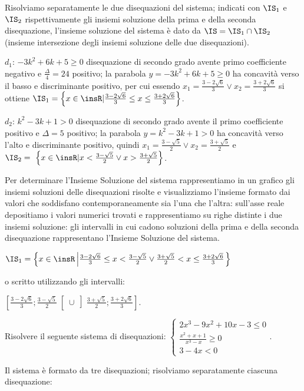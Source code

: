 Risolviamo separatamente le due disequazioni del sistema; indicati con $\IS_1$ 
e 
$\IS_2$ rispettivamente gli insiemi soluzione della prima e della seconda 
disequazione, l'insieme soluzione del sistema è dato da $\IS=\IS_1\cap \IS_2$ 
(insieme intersezione degli insiemi soluzione delle due disequazioni).
\begin{itemize*}
\item $d_1$: $-3k^2+6k+5\ge 0$ disequazione di secondo grado avente primo 
coefficiente negativo e $\frac{\Delta } 4=24$ positivo; la parabola 
$y=-3k^2+6k+5\ge 0$ ha concavità verso il basso e discriminante positivo, per 
cui essendo $x_1=\frac{3-2\sqrt 6} 3\vee x_2=\frac{3+2\sqrt 6} 3$ si ottiene 
$\IS_1=\left\{x\in \insR | \frac{3-2\sqrt 6} 3\le x\le \frac{3+2\sqrt 6} 
3\right\}$.
\item $d_2$: $k^2-3k+1>0$ disequazione di secondo grado avente il primo 
coefficiente positivo e $\Delta =5$ positivo; la parabola $y=k^2-3k+1>0$ ha 
concavità verso l'alto e discriminante positivo, quindi $x_1=\frac{3-\sqrt 5} 
2\vee x_2=\frac{3+\sqrt 5} 2$ e
$\IS_2=~\left\{x\in \insR | x<\frac{3-\sqrt 5} 2\vee x>\frac{3+\sqrt 5} 
2\right\}$.
\end{itemize*}
Per determinare l'Insieme Soluzione del sistema rappresentiamo in un grafico 
gli 
insiemi soluzioni delle disequazioni risolte e visualizziamo l'insieme formato 
dai valori che soddisfano contemporaneamente sia l'una che l'altra: sull'asse 
reale depositiamo i valori numerici trovati e rappresentiamo su righe distinte 
i 
due insiemi soluzione: gli intervalli in cui cadono soluzioni della prima e 
della seconda disequazione rappresentano l'Insieme Soluzione del sistema.
\begin{center}
 
\end{center}

$\IS_1=\left\{x\in \insR\left|\frac{3-2\sqrt 6} 3\le x<\frac{3-\sqrt 5} 2\vee 
\frac{3+\sqrt 5} 2<x\le \frac{3+2\sqrt 6} 3\right.\right\}$

o scritto utilizzando gli intervalli: 

$\left.\left[\frac{3-2\sqrt 6} 3;\frac{3-\sqrt 5} 
2\right.\right[ \cup \left.\left]\frac{3+\sqrt 5} 2;\frac{3+2\sqrt 6} 
3\right.\right]$.

\begin{problema}
Risolvere il seguente sistema di disequazioni: $ 
\left\{\begin{array}{l}2x^3-9x^2+10x-3\le 0\\ \frac{x^2+x+1}{\ x^3-x}\ge 0 
\\3-4x<0 \end{array}\right.$.
\end{problema}
Il sistema è formato da tre disequazioni; risolviamo separatamente ciascuna 
disequazione:

